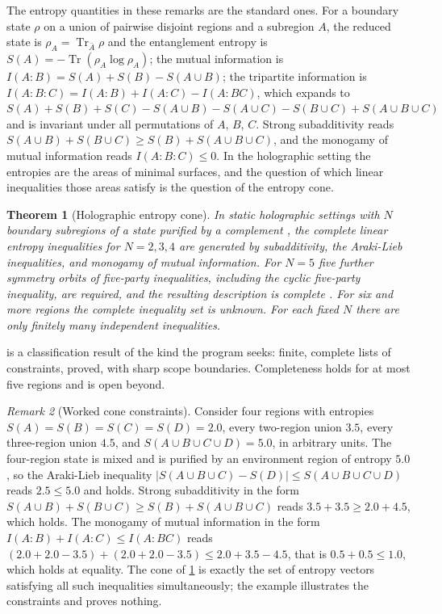 \documentclass[11pt,letterpaper]{article}
\newtheorem{theorem}{Theorem}[section]
\theoremstyle{definition}
\theoremstyle{remark}
\newtheorem{remark}[theorem]{Remark}
\begin{document}
The entropy quantities in these remarks are the standard ones. For a boundary state $\rho$ on a union of pairwise disjoint regions and a subregion $A$, the reduced state is $\rho_A = \operatorname{Tr}_{\bar{A}} \rho$ and the entanglement entropy is $S(A) = -\operatorname{Tr}(\rho_A \log \rho_A)$; the mutual information is $I(A:B) = S(A) + S(B) - S(A \cup B)$; the tripartite information is $I(A:B:C) = I(A:B) + I(A:C) - I(A:BC)$, which expands to $S(A) + S(B) + S(C) - S(A \cup B) - S(A \cup C) - S(B \cup C) + S(A \cup B \cup C)$ and is invariant under all permutations of $A$, $B$, $C$. Strong subadditivity reads $S(A \cup B) + S(B \cup C) \geq S(B) + S(A \cup B \cup C)$, and the monogamy of mutual information reads $I(A:B:C) \leq 0$. In the holographic setting the entropies are the areas of minimal surfaces, and the question of which linear inequalities those areas satisfy is the question of the entropy cone.

\begin{theorem}[Holographic entropy cone]
\label{thm:cone}
In static holographic settings with $N$ boundary subregions of a state purified by a complement \cite{bao}, the complete linear entropy inequalities for $N = 2, 3, 4$ are generated by subadditivity, the Araki-Lieb inequalities, and monogamy of mutual information. For $N = 5$ five further symmetry orbits of five-party inequalities, including the cyclic five-party inequality, are required, and the resulting description is complete \cite{hc5}. For six and more regions the complete inequality set is unknown. For each fixed $N$ there are only finitely many independent inequalities.
\end{theorem}

 is a classification result of the kind the program seeks: finite, complete lists of constraints, proved, with sharp scope boundaries. Completeness holds for at most five regions and is open beyond.

\begin{remark}[Worked cone constraints]
\label{rem:cone-worked}
Consider four regions with entropies $S(A) = S(B) = S(C) = S(D) = 2.0$, every two-region union $3.5$, every three-region union $4.5$, and $S(A \cup B \cup C \cup D) = 5.0$, in arbitrary units. The four-region state is mixed and is purified by an environment region of entropy $5.0$, so the Araki-Lieb inequality $|S(A \cup B \cup C) - S(D)| \leq S(A \cup B \cup C \cup D)$ reads $2.5 \leq 5.0$ and holds. Strong subadditivity in the form $S(A \cup B) + S(B \cup C) \geq S(B) + S(A \cup B \cup C)$ reads $3.5 + 3.5 \geq 2.0 + 4.5$, which holds. The monogamy of mutual information in the form $I(A:B) + I(A:C) \leq I(A:BC)$ reads $(2.0 + 2.0 - 3.5) + (2.0 + 2.0 - 3.5) \leq 2.0 + 3.5 - 4.5$, that is $0.5 + 0.5 \leq 1.0$, which holds at equality. The cone of \cref{thm:cone} is exactly the set of entropy vectors satisfying all such inequalities simultaneously; the example illustrates the constraints and proves nothing.
\end{remark}
\end{document}
